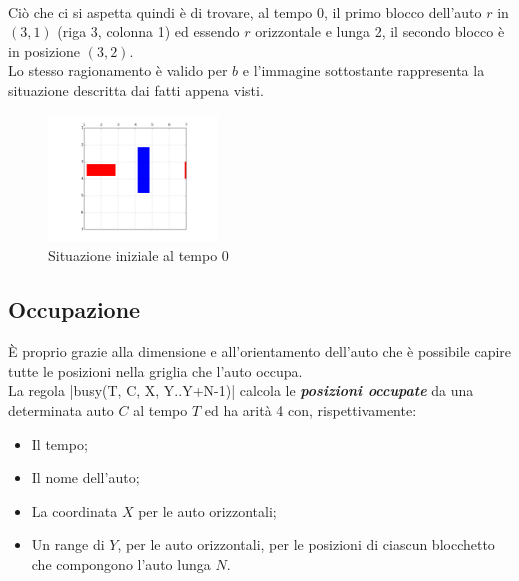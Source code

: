 \documentclass[10pt, a4paper, oneside]{article}
\begin{document}
\noindent
\\Ciò che ci si aspetta quindi è di trovare, al tempo 0, il primo blocco dell'auto $r$ in $(3,1)$ (riga 3, colonna 1) ed essendo $r$ orizzontale e lunga 2, il secondo blocco è in posizione $(3,2)$. \\
Lo stesso ragionamento è valido per $b$ e l'immagine sottostante rappresenta la situazione descritta dai fatti appena visti.%
\begin{figure}[H]
  \centering
  \includegraphics[width=0.4\textwidth]{images/0-example.PNG}
  \caption{Situazione iniziale al tempo 0}
  \label{fig:}
\end{figure}

























\newpage
\subsection{Occupazione}
È proprio grazie alla dimensione e all'orientamento dell'auto che è possibile capire tutte le posizioni nella griglia che l'auto occupa. \\

\noindent
La regola |busy(T, C, X, Y..Y+N-1)| calcola le \emph{\textbf{posizioni occupate}} da una determinata auto $C$ al tempo $T$ ed ha arità 4 con, rispettivamente:
\begin{itemize}
	\item Il tempo;
	\item Il nome dell'auto;
	\item La coordinata $X$ per le auto orizzontali;
	\item Un range di $Y$, per le auto orizzontali, per le posizioni di ciascun blocchetto che compongono l'auto lunga $N$.
\end{itemize}
\end{document}
